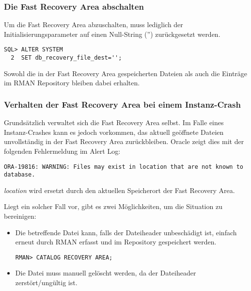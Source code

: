           \begin{literaturinternet}
            \item \cite{sthref3529}
            \item \cite{sthref3528}
          \end{literaturinternet}

        \subsubsection{Die Fast Recovery Area abschalten}
          Um die Fast Recovery Area abzuschalten, muss lediglich der Initialisierungsparameter  auf einen Null-String ('') zur\"uckgesetzt werden.
          \begin{lstlisting}[caption={Die Fast Recovery Area abschalten},label=admin1037,language=oracle_sql]
SQL> ALTER SYSTEM
  2  SET db_recovery_file_dest='';
          \end{lstlisting}
          Sowohl die in der Fast Recovery Area gespeicherten Dateien als auch die Eintr\"age im RMAN Repository bleiben dabei erhalten.
        \subsubsection{Verhalten der Fast Recovery Area bei einem Instanz-Crash}
          Grunds\"atzlich verwaltet sich die Fast Recovery Area selbst. Im Falle eines Instanz-Crashes kann es jedoch vorkommen, das aktuell ge\"offnete Dateien unvollst\"andig in der Fast Recovery Area zur\"uckbleiben. Oracle zeigt dies mit der folgenden Fehlermeldung im Alert Log:
          \begin{lstlisting}[caption={Besch\"adigte Dateien in der Fast Recovery Area},label=admin1038,language=rman]
ORA-19816: WARNING: Files may exist in location that are not known to database.
          \end{lstlisting}
          \textit{location} wird ersetzt durch den aktuellen Speicherort der Fast Recovery Area.

          Liegt ein solcher Fall vor, gibt es zwei M\"oglichkeiten, um die Situation zu bereinigen:
          \begin{itemize}
            \item Die betreffende Datei kann, falls der Dateiheader unbesch\"adigt ist, einfach erneut durch RMAN erfasst und im Repository gespeichert werden.
              \begin{lstlisting}[caption={Besch\"adigte Dateien in der Fast Recovery Area neu katalogisieren},label=admin1039,language=rman]
RMAN> CATALOG RECOVERY AREA;
              \end{lstlisting}
            \item Die Datei muss manuell gel\"oscht werden, da der Dateiheader zerst\"ort/ung\"ultig ist.
          \end{itemize}
